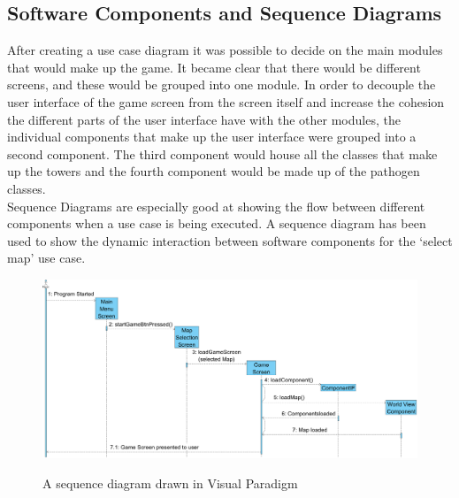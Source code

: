 \documentclass[a4paper,12pt]{article}
\begin{document}
\subsection*{Software Components and Sequence Diagrams}
After creating a use case diagram it was possible to decide on the main modules that would make up the game. It became clear that there would be different screens, and these would be grouped into one module. In order to decouple the user interface of the game screen from the screen itself and increase the cohesion the different parts of the user interface have with the other modules, the individual components that make up the user interface were grouped into a second component. The third component would house all the classes that make up the towers and the fourth component would be made up of the pathogen classes. 
\\
Sequence Diagrams are especially good at showing the flow between different components when a use case is being executed. A sequence diagram has been used to show the dynamic interaction between software components for the `select map' use case. 
\begin{figure}[h!]
	\begin{center}
		\includegraphics[width=12cm, origin=h]{images/Sequence-Diagram2.png}
		\\
		\caption{A sequence diagram drawn in Visual Paradigm}
	\end{center}
\end{figure}
\end{document}
